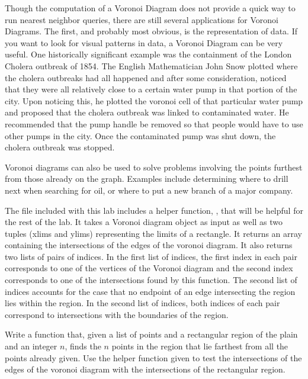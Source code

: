 Though the computation of a Voronoi Diagram does not provide a quick way to run nearest neighbor queries, there are still several applications for Voronoi Diagrams.
The first, and probably most obvious, is the representation of data.
If you want to look for visual patterns in data, a Voronoi Diagram can be very useful.
One historically significant example was the containment of the London Cholera outbreak of 1854.
The English Mathematician John Snow plotted where the cholera outbreaks had all happened and after some consideration, noticed that they were all relatively close to a certain water pump in that portion of the city.
Upon noticing this, he plotted the voronoi cell of that particular water pump and proposed that the cholera outbreak was linked to contaminated water.
He recommended that the pump handle be removed so that people would have to use other pumps in the city.
Once the contaminated pump was shut down, the cholera outbreak was stopped.

Voronoi diagrams can also be used to solve problems involving the points furthest from those already on the graph.
Examples include determining where to drill next when searching for oil, or where to put a new branch of a major company.

The file  included with this lab includes a helper function, , that will be helpful for the rest of the lab.
It takes a Voronoi diagram object as input as well as two tuples (xlims and ylims) representing the limits of a rectangle.
It returns an array containing the intersections of the edges of the voronoi diagram.
It also returns two lists of pairs of indices.
In the first list of indices, the first index in each pair corresponds to one of the vertices of the Voronoi diagram and the second index corresponds to one of the intersections found by this function.
The second list of indices accounts for the case that no endpoint of an edge intersecting the region lies within the region.
In the second list of indices, both indices of each pair correspond to intersections with the boundaries of the region.

\begin{problem}
\label{FurthestPoints}
Write a function that, given a list of points and a rectangular region of the plain and an integer $n$, finds the $n$ points in the region that lie farthest from all the points already given.
Use the helper function given to test the intersections of the edges of the voronoi diagram with the intersections of the rectangular region.
\end{problem}

